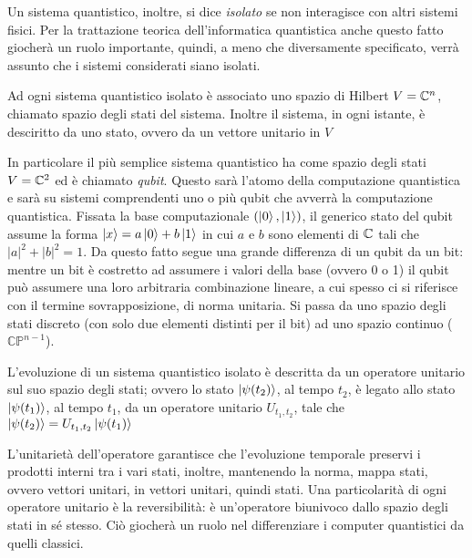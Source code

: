 Un sistema quantistico, inoltre, si dice \textit{isolato} se non interagisce con altri sistemi fisici.
Per la trattazione teorica dell'informatica quantistica anche questo fatto giocherà un ruolo importante, quindi, a meno che diversamente specificato, verrà assunto che i sistemi considerati siano isolati.

\begin{post}\label{post:mq1}
 Ad ogni sistema quantistico isolato è associato uno spazio di Hilbert $V = \mathbb{C}^{n}$, chiamato {\upshape spazio degli stati} del sistema. Inoltre il sistema, in ogni istante, è desciritto da uno {\upshape stato}, ovvero da un vettore unitario in $V$
\end{post}
In particolare il più semplice sistema quantistico ha come spazio degli stati $V = \mathbb{C}^{2}$ ed è chiamato \textit{qubit}.
Questo sarà l'atomo della computazione quantistica e sarà su sistemi comprendenti uno o più qubit che avverrà la computazione quantistica.
Fissata la base computazionale $\left(\ket{0}, \ket{1}\right)$, il generico stato del qubit assume la forma $\ket{x} = a\ket{0} + b\ket{1}$ in cui $a$ e $b$ sono elementi di $\mathbb{C}^{}$ tali che $|a|^2 + |b|^2 = 1$. 
Da questo fatto segue una grande differenza di un qubit da un bit: mentre un bit è costretto ad assumere i valori della base (ovvero 0 o 1) il qubit può assumere una loro arbitraria combinazione lineare, a cui spesso ci si riferisce con il termine sovrapposizione, di norma unitaria. 
Si passa da uno spazio degli stati discreto (con solo due elementi distinti per il bit) ad uno spazio continuo ($\mathbb{CP}^{n-1}$).
\newpage
\begin{post}\label{post:mq2}
 L'evoluzione di un sistema quantistico isolato è descritta da un operatore {\upshape unitario} sul suo spazio degli stati; ovvero lo stato $\ket{\psi(t_2)}$, al tempo $t_2$, è legato allo stato $\ket{\psi(t_1)}$, al tempo $t_1$, da un operatore unitario $U_{t_1,t_2}$, tale che $\ket{\psi(t_2)} = U_{t_1,t_2}\ket{\psi(t_1)}$
\end{post}
L'unitarietà dell'operatore garantisce che l'evoluzione temporale preservi i prodotti interni tra i vari stati, inoltre, mantenendo la norma, mappa stati, ovvero vettori unitari, in vettori unitari, quindi stati. Una particolarità di ogni operatore unitario è la reversibilità: è un'operatore biunivoco dallo spazio degli stati in sé stesso. Ciò giocherà un ruolo nel differenziare i computer quantistici da quelli classici.

